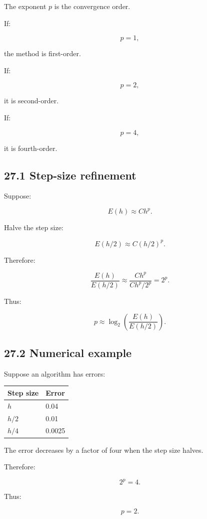 The exponent \(p\) is the convergence order.

If:

\[ p=1, \]

the method is first-order.

If:

\[ p=2, \]

it is second-order.

If:

\[ p=4, \]

it is fourth-order.

\subsection{27.1 Step-size refinement}\label{02-foundations-ii-ch029-step-size-refinement}

Suppose:

\[ E(h)\approx Ch^p. \]

Halve the step size:

\[ E(h/2)\approx C(h/2)^p. \]

Therefore:

\[ \frac{E(h)}{E(h/2)} \approx \frac{Ch^p}{Ch^p/2^p} =2^p. \]

Thus:

\[ \boxed{ p\approx \log_2\left( \frac{E(h)}{E(h/2)} \right) }. \]

\subsection{27.2 Numerical example}\label{02-foundations-ii-ch029-numerical-example}

Suppose an algorithm has errors:

{\def\LTcaptype{none} %
\begin{longtable}[]{@{}ll@{}}
\toprule\noalign{}
Step size & Error \\
\midrule\noalign{}
\endhead
\bottomrule\noalign{}
\endlastfoot
\(h\) & 0.04 \\
\(h/2\) & 0.01 \\
\(h/4\) & 0.0025 \\
\end{longtable}
}

The error decreases by a factor of four when the step size halves.

Therefore:

\[ 2^p=4. \]

Thus:

\[ \boxed{p=2}. \]

